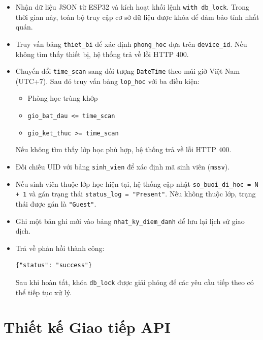\documentclass[12pt,a4paper]{report}
\begin{document}
\begin{itemize}

\item Nhận dữ liệu JSON từ ESP32 và kích hoạt khối lệnh 
\texttt{with db\_lock}. Trong thời gian này, toàn bộ truy cập cơ sở dữ liệu
được khóa để đảm bảo tính nhất quán.

\item Truy vấn bảng \texttt{thiet\_bi} để xác định 
\texttt{phong\_hoc} dựa trên \texttt{device\_id}. 
Nếu không tìm thấy thiết bị, hệ thống trả về lỗi HTTP 400.

\item Chuyển đổi \texttt{time\_scan} sang đối tượng 
\texttt{DateTime} theo múi giờ Việt Nam (UTC+7). Sau đó truy vấn bảng
\texttt{lop\_hoc} với ba điều kiện:
\begin{itemize}
\item Phòng học trùng khớp
\item \texttt{gio\_bat\_dau <= time\_scan}
\item \texttt{gio\_ket\_thuc >= time\_scan}
\end{itemize}

Nếu không tìm thấy lớp học phù hợp, hệ thống trả về lỗi HTTP 400.

\item Đối chiếu UID với bảng \texttt{sinh\_vien} để xác định mã sinh viên
(\texttt{mssv}).

\item Nếu sinh viên thuộc lớp học hiện tại, hệ thống cập nhật
\texttt{so\_buoi\_di\_hoc = N + 1} và gán trạng thái 
\texttt{status\_log = "Present"}.
Nếu không thuộc lớp, trạng thái được gán là \texttt{"Guest"}.

\item Ghi một bản ghi mới vào bảng \texttt{nhat\_ky\_diem\_danh}
để lưu lại lịch sử giao dịch.

\item Trả về phản hồi thành công:

\begin{verbatim}
{"status": "success"}
\end{verbatim}

Sau khi hoàn tất, khóa \texttt{db\_lock} được giải phóng để
các yêu cầu tiếp theo có thể tiếp tục xử lý.

\end{itemize}

\section{Thiết kế Giao tiếp API}
\end{document}
